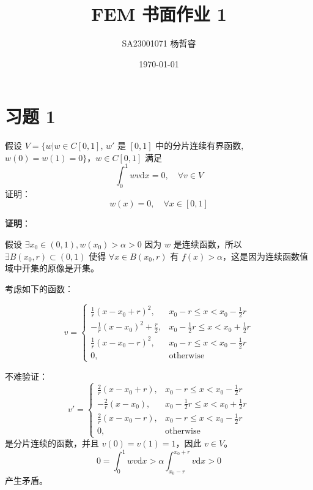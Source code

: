 \documentclass[11pt]{ctexart}
\title{FEM 书面作业 1}
\author{SA23001071 杨哲睿}
\date{\today}
\begin{document}
\maketitle

\section{习题 1}

假设 $V = \{ w | w \in C [0, 1] $, $w'$ 是 $[0, 1]$ 中的分片连续有界函数, $w(0) = w(1) = 0\}$，$w \in C[0, 1]$ 满足 
$$ \int _0 ^ 1w v \mathrm d x = 0,\quad \forall v \in V $$
证明：
$$ w(x) = 0, \quad \forall x \in [0, 1]$$

{\flushleft \textbf{证明}：}

假设 $\exists x_0\in (0, 1), w(x_0) > \alpha > 0$ 因为 $w$ 是连续函数，所以 $\exists B(x_0, r) \subset (0,1)$ 使得 $\forall x \in B(x_0, r)$ 有 $f(x) > \alpha$，这是因为连续函数值域中开集的原像是开集。

考虑如下的函数：

\begin{equation}
  v = \begin{cases}
    \frac{1}{r}(x- x_0 + r)^2, & x_0 - r \le x < x_0 - \frac{1}{2} r\\
    - \frac{1}{r}(x - x_0) ^ 2 + \frac{r}{2}, & x_0 - \frac 1 2 r \le x < x_0 + \frac 1 2 r \\
    \frac{1}{r}(x- x_0 - r)^2, & x_0 - r \le x < x_0 - \frac{1}{2} r\\
    0, & \text{otherwise}
  \end{cases}
\end{equation}

不难验证：
\begin{equation}
  v' = \begin{cases}
    \frac{2}{r}(x-x_0+r),  & x_0 - r \le x < x_0 - \frac{1}{2} r\\
    - \frac{2}{r}(x - x_0), & x_0 - \frac 1 2 r \le x < x_0 + \frac 1 2 r \\
    \frac{2}{r}(x- x_0 - r), & x_0 - r \le x < x_0 - \frac{1}{2} r\\
    0, & \text{otherwise}
  \end{cases}
\end{equation}
是分片连续的函数，并且 $v(0) = v(1) = 1$，因此 $v \in V$。
\begin{equation}
  0 = \int_0 ^ 1 w v \mathrm dx > \alpha \int_{x_0 - r} ^ {x_0+r} v \mathrm dx > 0 
\end{equation}
产生矛盾。
\end{document}
